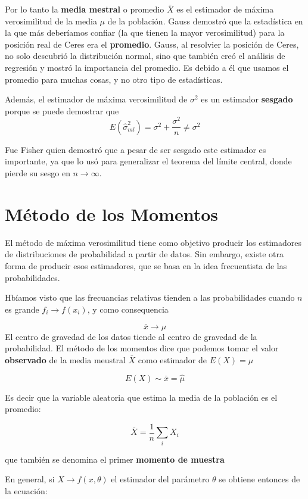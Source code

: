 \documentclass[
]{book}
\begin{document}
Por lo tanto la \textbf{media mestral} o promedio \(\bar{X}\) es el estimador de máxima verosimilitud de la media \(\mu\) de la población. Gauss demostró que la estadística en la que más deberíamos confiar (la que tienen la mayor verosimilitud) para la posición real de Ceres era el \textbf{promedio}. Gauss, al resolvier la posición de Ceres, no solo descubrió la distribución normal, sino que también creó el análisis de regresión y mostró la importancia del promedio. Es debido a él que usamos el promedio para muchas cosas, y no otro tipo de estadísticas.

Además, el estimador de máxima verosimilitud de \(\sigma^2\) es un estimador \textbf{sesgado} porque se puede demostrar que \[E(\hat{\sigma}^2_{ml})=\sigma^2+ \frac{\sigma^2}{n}\neq\sigma^2\]

Fue Fisher quien demostró que a pesar de ser sesgado este estimador es importante, ya que lo usó para generalizar el teorema del límite central, donde pierde su sesgo en \(n\rightarrow \infty\).

\hypertarget{muxe9todo-de-los-momentos}{%
\section{Método de los Momentos}\label{muxe9todo-de-los-momentos}}

El método de máxima verosimilitud tiene como objetivo producir los estimadores de distribuciones de probabilidad a partir de datos. Sin embargo, existe otra forma de producir esos estimadores, que se basa en la idea frecuentista de las probabilidades.

Hbíamos visto que las frecuancias relativas tienden a las probabilidades cuando \(n\) es grande \(f_i \rightarrow f(x_i)\), y como consequencia

\[\bar{x} \rightarrow \mu\]
El centro de gravedad de los datos tiende al centro de gravedad de la probabilidad.
El método de los momentos dice que podemos tomar el valor \textbf{observado} de la media meustral \(\bar{X}\) como estimador de \(E(X)=\mu\)

\[E(X)\sim \bar{x}=\hat{\mu}\]

Es decir que la variable aleatoria que estima la media de la población es el promedio:

\[\bar{X}= \frac{1}{n}\sum_i X_i\]

que también se denomina el primer \textbf{momento de muestra}

En general, si \(X \rightarrow f(x, \theta)\) el estimador del parámetro \(\theta\) se obtiene entonces de la ecuación:
\end{document}
